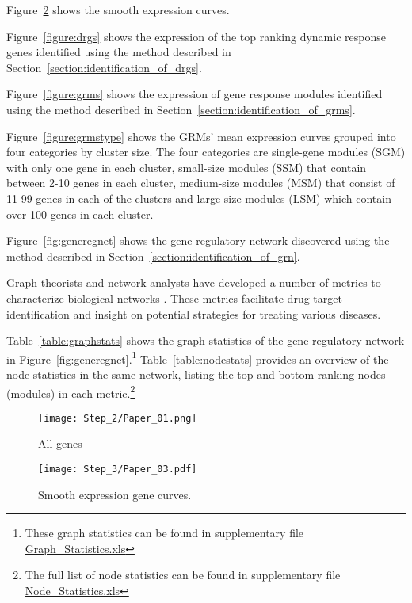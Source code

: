 

Figure~\ref{fig:smoothexp} shows the smooth expression curves.

Figure~\ref{figure:drgs} shows the expression of the top ranking dynamic response genes identified using the method described in Section~\ref{section:identification_of_drgs}.

Figure~\ref{figure:grms} shows the expression of gene response modules identified using the method described in Section~\ref{section:identification_of_grms}.

Figure~\ref{figure:grmstype} shows the GRMs' mean expression curves grouped into four categories by cluster size. The four categories are single-gene modules (SGM) with only one gene in each cluster, small-size modules (SSM) that contain between 2-10 genes in each cluster, medium-size modules (MSM) that consist of 11-99 genes in each of the clusters and large-size modules (LSM) which contain over 100 genes in each cluster.

Figure~\ref{fig:generegnet} shows the gene regulatory network discovered using the method described in Section~\ref{section:identification_of_grn}.

Graph theorists and network analysts have developed a number of metrics to characterize biological networks \cite{huber2007graphs, lee2004coexpression}. These metrics facilitate drug target identification and insight on potential strategies for treating various diseases.

Table~\ref{table:graphstats} shows the graph statistics of the gene regulatory network in Figure~\ref{fig:generegnet}.\footnote{These graph statistics can be found in supplementary file \href{Step_7/Graph\_Statistics.xls}{Graph\_Statistics.xls}} Table~\ref{table:nodestats} provides an overview of the node statistics in the same network, listing the top and bottom ranking nodes (modules) in each metric.\footnote{The full list of node statistics can be found in supplementary file \href{Step_7/Node\_Statistics.xls}{Node\_Statistics.xls}}

\begin{figure}
\centering
\texttt{[image: Step\_2/Paper\_01.png]}
\caption{All genes}
\label{fig:allgenes}
\end{figure}

\begin{figure}
\texttt{[image: Step\_3/Paper\_03.pdf]}
\caption{Smooth expression gene curves.}
\label{fig:smoothexp}
\end{figure}

